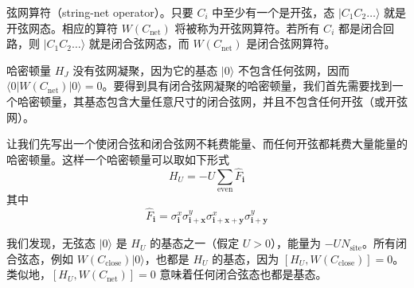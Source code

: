 弦网算符（string-net operator）。只要 $C_i$ 中至少有一个是开弦，态 $|C_1C_2\dots\rangle$ 就是开弦网态。相应的算符 $W(C_{\mathrm{net}})$ 将被称为开弦网算符。若所有 $C_i$ 都是闭合回路，则 $|C_1C_2\dots\rangle$ 就是闭合弦网态，而 $W(C_{\mathrm{net}})$ 是闭合弦网算符。

哈密顿量 $H_J$ 没有弦网凝聚，因为它的基态 $|0\rangle$ 不包含任何弦网，因而 $\langle0|W(C_{\mathrm{net}})|0\rangle=0$。要得到具有闭合弦网凝聚的哈密顿量，我们首先需要找到一个哈密顿量，其基态包含大量任意尺寸的闭合弦网，并且不包含任何开弦（或开弦网）。

让我们先写出一个使闭合弦和闭合弦网不耗费能量、而任何开弦都耗费大量能量的哈密顿量。这样一个哈密顿量可以取如下形式
\begin{equation*}
H_U=-U\sum_{\mathrm{even}}\hat F_{\pmb{i}}
\end{equation*}
其中
\begin{equation*}
\hat F_{\pmb{i}}=\sigma_{\pmb{i}}^{x}\sigma_{\pmb{i}+\pmb{x}}^{y}\sigma_{\pmb{i}+\pmb{x}+\pmb{y}}^{x}\sigma_{\pmb{i}+\pmb{y}}^{y}\tag{10.3.2}
\end{equation*}

我们发现，无弦态 $|0\rangle$ 是 $H_U$ 的基态之一（假定 $U>0$），能量为 $-UN_{\mathrm{site}}$。所有闭合弦态，例如 $W(C_{\mathrm{close}})|0\rangle$，也都是 $H_U$ 的基态，因为 $[H_U,W(C_{\mathrm{close}})]=0$。类似地，$[H_U,W(C_{\mathrm{net}})]=0$ 意味着任何闭合弦态也都是基态。

